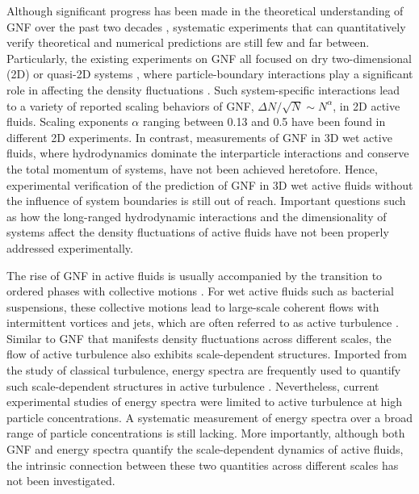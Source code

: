 \documentclass[twocolumn,aps,prx,amsmath,amssymb,longbibliography]{revtex4-2}
\begin{document}
Although significant progress has been made in the theoretical understanding of GNF over the past two decades \cite{Toner1995, Tu1998, Toner1998, AditiSimha2002, Ramaswamy2003, Toner2005, Chate2008, Mishra2010, Dey2012, Saintillan2012, Saintillan2013, Ngo2014,  Mahault2019}, systematic experiments that can quantitatively verify theoretical and numerical predictions are still few and far between. Particularly, the existing experiments on GNF all focused on dry two-dimensional (2D) or quasi-2D systems \cite{Narayan2007, Aranson2008, Kudrolli2008, Deseigne2010, Zhang2010, Schaller2013, Nishiguchi2017, Kawaguchi2017, Palacci2013}, where particle-boundary interactions play a significant role in affecting the density fluctuations \cite{Marchetti2013}. Such system-specific interactions lead to a variety of reported scaling behaviors of GNF, $\Delta N/\sqrt N \sim N^\alpha$, in 2D active fluids. Scaling exponents $\alpha$ ranging between 0.13 and 0.5 have been found in different 2D experiments. In contrast, measurements of GNF in 3D wet active fluids, where hydrodynamics dominate the interparticle interactions and conserve the total momentum of systems, have not been achieved heretofore. Hence, experimental verification of the prediction of GNF in 3D wet active fluids without the influence of system boundaries is still out of reach. Important questions such as how the long-ranged hydrodynamic interactions and the dimensionality of systems affect the density fluctuations of active fluids have not been properly addressed experimentally.

The rise of GNF in active fluids is usually accompanied by the transition to ordered phases with collective motions \cite{Ramaswamy2010,Marchetti2013}. For wet active fluids such as bacterial suspensions, these collective motions lead to large-scale coherent flows with intermittent vortices and jets, which are often referred to as active turbulence \cite{Wolgemuth2008,Wensink2012,Dunkel2013a,Bratanov2015,Guo2018,Linkmann2019,Bardfalvy2019,Alert2020,Skultety2020,Peng2020}. Similar to GNF that manifests density fluctuations across different scales, the flow of active turbulence also exhibits scale-dependent structures. Imported from the study of classical turbulence, energy spectra are frequently used to quantify such scale-dependent structures in active turbulence \cite{Ishikawa2011,Wensink2012,Dunkel2013a,Giomi2015,Creppy2015,Patteson2018,Alert2020}. Nevertheless, current experimental studies of energy spectra were limited to active turbulence at high particle concentrations. A systematic measurement of energy spectra over a broad range of particle concentrations is still lacking. More importantly, although both GNF and energy spectra quantify the scale-dependent dynamics of active fluids, the intrinsic connection between these two quantities across different scales has not been investigated.
\end{document}

